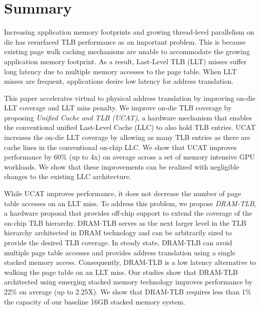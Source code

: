 \section{Summary}

\noindent Increasing application memory footprints and growing
thread-level parallelism on die has resurfaced TLB performance as an
important problem. This is because existing page walk caching
mechanisms are unable to accommodate the growing application memory
footprint. As a result, Last-Level TLB (LLT) misses suffer long
latency due to multiple memory accesses to the page table. When LLT
misses are frequent, applications desire low latency for address
translation.

This paper accelerates virtual to physical address translation by
improving on-die LLT coverage and LLT miss penalty. We improve on-die
TLB coverage by proposing {\em Unified Cache and TLB (UCAT)}, a
hardware mechanism that enables the conventional unified Last-Level
Cache (LLC) to also hold TLB entries. UCAT increases the on-die LLT
coverage by allowing as many TLB entries as there are cache lines in
the conventional on-chip LLC. We show that UCAT improves performance
by 60\% (up to 4x) on average across a set of memory intensive GPU
workloads. We show that these improvements can be realized with
negligible changes to the existing LLC architecture.


While UCAT improves performance, it does not decrease the number of
page table accesses on an LLT miss. To address this problem, we
propose {\em DRAM-TLB}, a hardware proposal that provides off-chip
support to extend the coverage of the on-chip TLB hierarchy. DRAM-TLB
serves as the next larger level in the TLB hierarchy architected in
DRAM technology and can be arbitrarily sized to provide the desired
TLB coverage. In steady state, DRAM-TLB can avoid multiple page table
accesses and provides address translation using a single stacked
memory access. Consequently, DRAM-TLB is a low latency alternative to
walking the page table on an LLT miss. Our studies show that DRAM-TLB
architected using emerging stacked memory technology improves
performance by 22\% on average (up to 2.25X). We show that DRAM-TLB
requires less than 1\% the capacity of our baseline 16GB stacked
memory system.


% 
